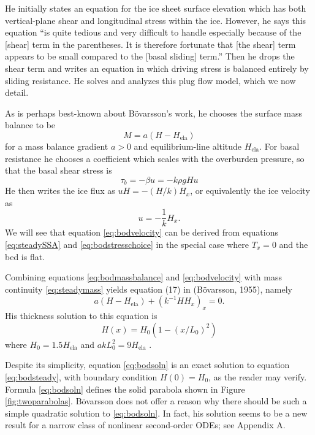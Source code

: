 \documentclass[review,letterpaper]{igs}
\renewcommand{\dh}{\fontencoding{T1}\selectfont{\symbol{240}}}
\newcommand{\bod}{B\"o\dh varsson\xspace}
\newcommand{\citepbod}{(B\"o\dh varsson, 1955)\nocite{Bodvardsson}\xspace}
\newcommand{\Hela}{H_{\text{ela}}}
\begin{document}
He initially states an equation for the ice sheet surface elevation which has both vertical-plane shear and longitudinal stress within the ice.  However, he says this equation ``is quite tedious and very difficult to handle especially because of the [shear] term in the parentheses.  It is therefore fortunate that [the shear] term appears to be small compared to the [basal sliding] term.''  Then he drops the shear term and writes an equation in which driving stress is balanced entirely by sliding resistance.  He solves and analyzes this plug flow model, which we now detail.

As is perhaps best-known about \bod's work, he chooses the surface mass balance to be
\begin{equation}
M = a (H - \Hela)  \label{eq:bodmassbalance}
\end{equation}
for a mass balance gradient $a>0$ and equilibrium-line altitude $\Hela$.  For basal resistance he chooses a coefficient which scales with the overburden pressure, so that the basal shear stress is
\begin{equation}
\tau_b = - \beta u = - k \rho g H u  \label{eq:bodstresschoice}
\end{equation}
He then writes the ice flux as $uH=-(H/k) H_x$, or equivalently the ice velocity as
\begin{equation}
u = - \frac{1}{k} H_x. \label{eq:bodvelocity}
\end{equation}
We will see that equation \eqref{eq:bodvelocity} can be derived from equations \eqref{eq:steadySSA} and \eqref{eq:bodstresschoice} in the special case where $T_x=0$ and the bed is flat.

Combining equations \eqref{eq:bodmassbalance} and \eqref{eq:bodvelocity} with mass continuity \eqref{eq:steadymass} yields equation (17) in \citepbod, namely
\begin{equation}
a (H - \Hela) + (k^{-1} H H_x)_x = 0.  \label{eq:bodsteady}
\end{equation}
His thickness solution to this equation is \citep[equations (18) and (23)]{Bodvardsson}
\begin{equation}
H(x) = H_0 (1 - (x/L_0)^2)  \label{eq:bodsoln}
\end{equation}
where $H_0 = 1.5 \Hela$ and $a k L_0^2 = 9 \Hela$ \citep[equation (24)]{Bodvardsson}.

Despite its simplicity, equation \eqref{eq:bodsoln} is an exact solution to equation \eqref{eq:bodsteady}, with boundary condition $H(0)=H_0$, as the reader may verify.  Formula \eqref{eq:bodsoln} defines the solid parabola shown in Figure \ref{fig:twoparabolas}.  \bod does not offer a reason why there should be such a simple quadratic solution to \eqref{eq:bodsoln}.  In fact, his solution seems to be a new result for a narrow class of nonlinear second-order ODEs; see Appendix A.
\end{document}
